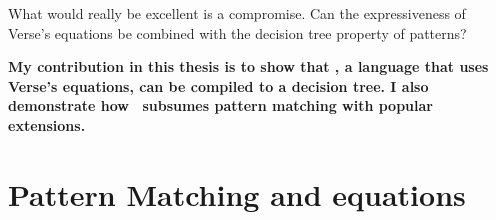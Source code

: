 \documentclass[manuscript,screen,review, 12pt, nonacm]{acmart}
\begin{document}
\begin{outline}[enumerate]
What would really be excellent is a compromise. Can the expressiveness of
Verse's equations be combined with the decision tree property of patterns? 


\bf{My contribution in this thesis} is to show that \VMinus, a language that
uses Verse's equations, can be compiled to a decision tree. I also demonstrate
how \VMinus\ subsumes pattern matching with popular extensions. 









\section{Pattern Matching and equations}
\label{pmandequations}


\end{outline}
\end{document}
